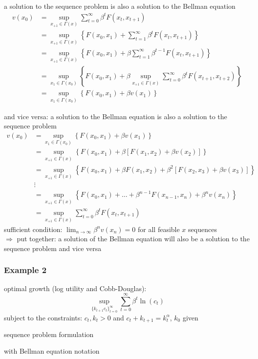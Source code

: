 \documentclass[compress,aspectratio=169]{beamer}
\begin{document}
\begin{frame}
a solution to the sequence problem is also a solution to the Bellman equation
\begin{align*}
v(x_0) & = \sup_{x_{+1}\in \Gamma(x)}\sum_{t=0}^{\infty}\beta^t F(x_t,x_{t+1}) \\
& = \sup_{x_{+1}\in \Gamma(x)} \left\{ F(x_0,x_1)+\sum_{t=1}^{\infty}\beta^t F(x_t,x_{t+1})\right\} \\
& = \sup_{x_{+1}\in \Gamma(x)} \left\{ F(x_0,x_1)+\beta \sum_{t=1}^{\infty}\beta^{t-1} F(x_t,x_{t+1})\right\} \\
& = \sup_{x_1\in \Gamma(x_0)} \left\{ F(x_0,x_1)+\beta \sup_{x_{+1}\in \Gamma(x)} \sum_{t=0}^{\infty}\beta^t F(x_{t+1},x_{t+2})\right\} \\
& = \sup_{x_1\in \Gamma(x_0)} \left\{ F(x_0,x_1)+\beta v(x_1) \right\}
\end{align*}
\end{frame}

\begin{frame}
and vice versa: a solution to the Bellman equation is also a solution to the sequence problem
\begin{align*}
v(x_0) & = \sup_{x_1\in \Gamma(x_0)} \left\{ F(x_0,x_1)+\beta v(x_1)\right\} \\
& = \sup_{x_{+1}\in \Gamma(x)} \left\{ F(x_0,x_1)+\beta\left[ F(x_1,x_2)+\beta v(x_2)\right]\right\} \\
& = \sup_{x_{+1}\in \Gamma(x)} \left\{ F(x_0,x_1)+\beta F(x_1,x_2)+\beta^2\left[ F(x_2,x_3)+\beta v(x_3)\right]\right\} \\
& \vdots \\
& = \sup_{x_{+1}\in \Gamma(x)} \left\{ F(x_0,x_1)+\ldots+\beta^{n-1} F(x_{n-1},x_{n})+\beta^n v(x_n)\right\} \\
& = \sup_{x_{+1}\in \Gamma(x)} \sum_{t=0}^{\infty} \beta^t F(x_t,x_{t+1})
\end{align*}
{\footnotesize{sufficient condition: $\lim_{n\rightarrow\infty} \beta^n v(x_n)=0$ for all feasible $x$ sequences}} \\

\vspace{2 mm}
$\Rightarrow$ put together: a solution of the Bellman equation will also be a solution to the sequence problem and vice versa
\end{frame}


\begin{frame}
\frametitle{Example 2}
optimal growth (log utility and Cobb-Douglas):
\begin{displaymath}
\sup_{\{k_{t+1}c_{t}\}_{t=0}^{\infty}}\sum_{t=0}^{\infty}\beta^t \ln(c_t)
\end{displaymath}
subject to the constraints: $c_t,k_t>0$ and $c_t+k_{t+1}=k_t^\alpha$, $k_0$ given

\vspace{2 mm}
sequence problem formulation \\

\vspace{18 mm}

with Bellman equation notation

\vspace{10 mm}
\end{frame}
\end{document}
